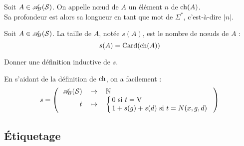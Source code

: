 		\begin{Definition}
			Soit \(A\in\mathscr{A}_{\!B}(\mathcal{S})\). On appelle n\oe ud de \(A\) un élément \(n\) de \(\operatorname{ch}(A)\). \\
			Sa profondeur est alors sa longueur en tant que mot de \(\Sigma^*\), c'est-à-dire \(|n|\).
		\end{Definition}
		
		\eqskip{1mm}
		\begin{Definition}
			Soit \(A\in\mathscr{A}_{\!B}(\mathcal{S})\). La taille de \(A\), notée \(s(A)\), est le nombre de n\oe uds de \(A\) :
				\[
					s(A) = \operatorname{Card}(\operatorname{ch}(A))
				\]
		\end{Definition}
		
		\begin{Exercice}
			Donner une définition inductive de \(s\).
		\end{Exercice}
		
		\eqskip{2mm}
		\colsep{2.2pt}
		\begin{Correction}
			En s'aidant de la définition de \(\operatorname{ch}\), on a facilement : \[s = \fun{\AB(\cal{S})}{\bb{N}}{t}{\colsep{1.5pt}
				\left\{ \begin{tabular}[h]{l}
					\(0\) si \(t = \V\) \\
					\(1 + s(g) + s(d)\) si \(t = \N(x,g,d)\)
				\end{tabular} \right.
			}\]
		\end{Correction}
	
	\subsection{\'Etiquetage}
		
